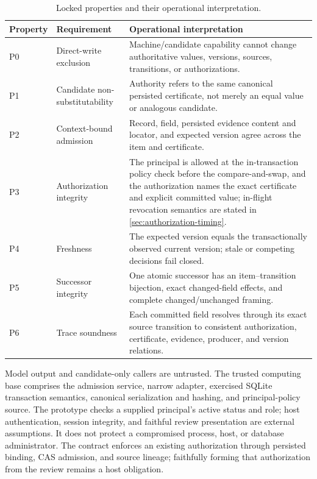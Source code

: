\begin{table}[t]
\centering
\caption{Locked properties and their operational interpretation.}
\label{tab:properties}
\begin{tabularx}{\textwidth}{@{}l>{\raggedright\arraybackslash}p{}>{\raggedright\arraybackslash}X@{}}
\toprule
Property & Requirement & Operational interpretation \\
\midrule
P0 & Direct-write exclusion & Machine/candidate capability cannot change authoritative values, versions, sources, transitions, or authorizations. \\
P1 & Candidate non-substitutability & Authority refers to the same canonical persisted certificate, not merely an equal value or analogous candidate. \\
P2 & Context-bound admission & Record, field, persisted evidence content and locator, and expected version agree across the item and certificate. \\
P3 & Authorization integrity & The principal is allowed at the in-transaction policy check before the compare-and-swap, and the authorization names the exact certificate and explicit committed value; in-flight revocation semantics are stated in \cref{sec:authorization-timing}. \\
P4 & Freshness & The expected version equals the transactionally observed current version; stale or competing decisions fail closed. \\
P5 & Successor integrity & One atomic successor has an item--transition bijection, exact changed-field effects, and complete changed/unchanged framing. \\
P6 & Trace soundness & Each committed field resolves through its exact source transition to consistent authorization, certificate, evidence, producer, and version relations. \\
\bottomrule
\end{tabularx}
\end{table}

Model output and candidate-only callers are untrusted. The trusted computing base comprises the admission service, narrow adapter, exercised SQLite transaction semantics, canonical serialization and hashing, and principal-policy source. The prototype checks a supplied principal's active status and role; host authentication, session integrity, and faithful review presentation are external assumptions. It does not protect a compromised process, host, or database administrator. The contract enforces an existing authorization through persisted binding, CAS admission, and source lineage; faithfully forming that authorization from the review remains a host obligation.

